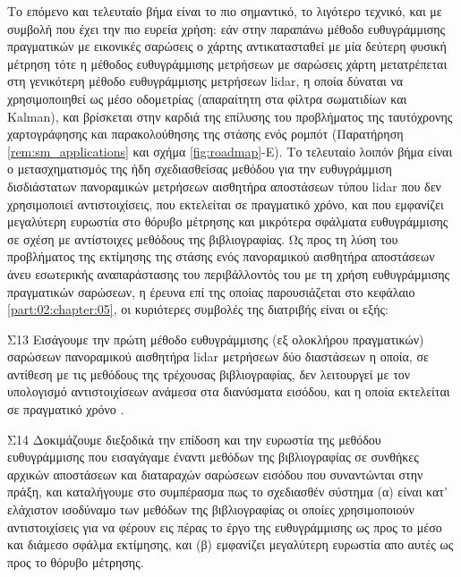 Το επόμενο και τελευταίο βήμα είναι το πιο σημαντικό, το λιγότερο τεχνικό, και
με συμβολή που έχει την πιο ευρεία χρήση: εάν στην παραπάνω μέθοδο
ευθυγράμμισης πραγματικών με εικονικές σαρώσεις ο χάρτης αντικατασταθεί με μία
δεύτερη φυσική μέτρηση τότε η μέθοδος ευθυγράμμισης μετρήσεων με σαρώσεις χάρτη
μετατρέπεται στη γενικότερη μέθοδο ευθυγράμμισης μετρήσεων lidar, η οποία
δύναται να χρησιμοποιηθεί ως μέσο οδομετρίας (απαραίτητη στα φίλτρα
σωματιδίων και Kalman), και βρίσκεται στην καρδιά της επίλυσης του προβλήματος
της ταυτόχρονης χαρτογράφησης και παρακολούθησης της στάσης ενός ρομπότ
(Παρατήρηση \ref{rem:sm_applications} και σχήμα \ref{fig:roadmap}-Ε). Το
τελευταίο λοιπόν βήμα είναι ο μετασχηματισμός της ήδη σχεδιασθείσας μεθόδου για
την ευθυγράμμιση δισδιάστατων πανοραμικών μετρήσεων αισθητήρα αποστάσεων τύπου
lidar που δεν χρησιμοποιεί αντιστοιχίσεις, που εκτελείται σε πραγματικό χρόνο,
και που εμφανίζει μεγαλύτερη ευρωστία στο θόρυβο μέτρησης και μικρότερα
σφάλματα ευθυγράμμισης σε σχέση με αντίστοιχες μεθόδους της βιβλιογραφίας. Ως
προς τη λύση του προβλήματος της εκτίμησης της στάσης ενός πανοραμικού
αισθητήρα αποστάσεων άνευ εσωτερικής αναπαράστασης του περιβάλλοντός του με τη
χρήση ευθυγράμμισης πραγματικών σαρώσεων, η έρευνα επί της οποίας παρουσιάζεται
στο κεφάλαιο \ref{part:02:chapter:05}, οι κυριότερες συμβολές της διατριβής
είναι οι εξής:

\begin{bw_box}
\begin{customcontribution}{Σ13}
  \label{contribution:13}
  Εισάγουμε την πρώτη μέθοδο ευθυγράμμισης (εξ ολοκλήρου πραγματικών) σαρώσεων
  πανοραμικού αισθητήρα lidar μετρήσεων δύο διαστάσεων η οποία, σε αντίθεση με
  τις μεθόδους της τρέχουσας βιβλιογραφίας, δεν λειτουργεί με τον υπολογισμό
  αντιστοιχίσεων ανάμεσα στα διανύσματα εισόδου, και η οποία εκτελείται σε
  πραγματικό χρόνο \cite{Filotheou2022i}.
\end{customcontribution}
\end{bw_box}

\begin{bw_box}
\begin{customcontribution}{Σ14}
  \label{contribution:14}
  Δοκιμάζουμε διεξοδικά την επίδοση και την ευρωστία της μεθόδου ευθυγράμμισης
  που εισαγάγαμε έναντι μεθόδων της βιβλιογραφίας σε συνθήκες αρχικών
  αποστάσεων και διαταραχών σαρώσεων εισόδου που συναντώνται στην πράξη, και
  καταλήγουμε στο συμπέρασμα πως το σχεδιασθέν σύστημα (α) είναι κατ' ελάχιστον
  ισοδύναμο των μεθόδων της βιβλιογραφίας οι οποίες χρησιμοποιούν
  αντιστοιχίσεις για να φέρουν εις πέρας το έργο της ευθυγράμμισης ως προς το
  μέσο και διάμεσο σφάλμα εκτίμησης, και (β) εμφανίζει μεγαλύτερη ευρωστία απο
  αυτές ως προς το θόρυβο μέτρησης.
\end{customcontribution}
\end{bw_box}


